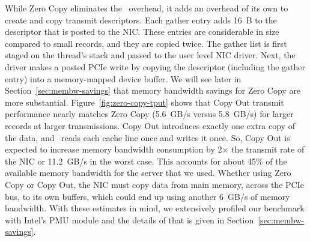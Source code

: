 While Zero Copy eliminates the \memcpy ~overhead, it adds an overhead of its own to create and copy transmit descriptors.
Each gather entry adds 16~B to the descriptor that is posted to the NIC.
These entries are considerable in size compared to
small records, and they are copied twice. The gather list
is first staged on the thread's stack and passed to the user level NIC driver. Next,
the driver makes a posted PCIe write by copying the descriptor (including the
gather entry) into a memory-mapped device buffer.
We will see later in Section~\ref{sec:membw-savings} that memory bandwidth savings for Zero Copy are more substantial.
Figure~\ref{fig:zero-copy-tput} shows that Copy Out transmit performance nearly
matches Zero Copy (5.6~GB/s versus 5.8~GB/s) for larger records at larger transmissions. Copy Out introduces exactly one
extra copy of the data, and \memcpy~reads each cache line once and writes it
once. So, Copy Out is expected to increase memory bandwidth consumption
by 2$\times$ the transmit rate of the NIC or 11.2~GB/s in the worst case. This
accounts for about 45\% of the available memory bandwidth for the server that we used. Whether
using Zero Copy or Copy Out, the NIC must copy data from main memory, across the PCIe bus, to its own buffers, which
could end up using another 6~GB/s of memory bandwidth. With these estimates in mind, we extensively profiled
 our benchmark with Intel's PMU module and the details of that is given in Section~\ref{sec:membw-savings}.
\newline





